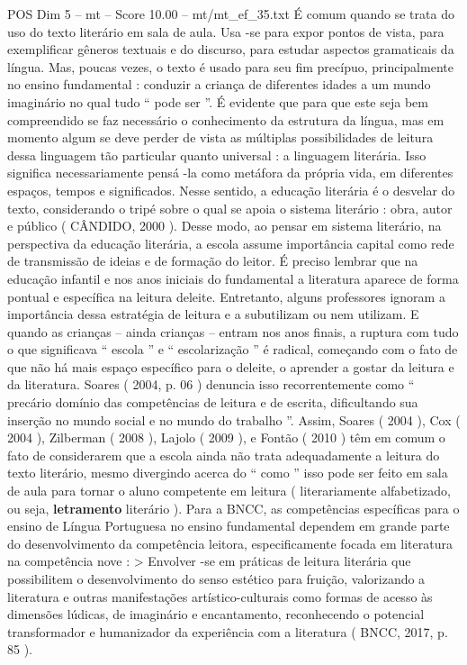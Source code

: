\begin{textsample}{POS Dim 5 – mt – Score 10.00 – mt/mt\_ef\_35.txt}
É comum quando se trata do uso do texto literário em sala de aula.
Usa -se para expor pontos de vista, para exemplificar gêneros textuais e do discurso, para estudar aspectos gramaticais da língua.
Mas, poucas vezes, o texto é usado para seu fim precípuo, principalmente no ensino fundamental : conduzir a criança de diferentes idades a um mundo imaginário no qual tudo “ pode ser ”.
É evidente que para que este seja bem compreendido se faz necessário o conhecimento da estrutura da língua, mas em momento algum se deve perder de vista as múltiplas possibilidades de leitura dessa linguagem tão particular quanto universal : a linguagem literária.
Isso significa necessariamente pensá -la como metáfora da própria vida, em diferentes espaços, tempos e significados.
Nesse sentido, a educação literária é o desvelar do texto, considerando o tripé sobre o qual se apoia o sistema literário : obra, autor e público ( CÂNDIDO, 2000 ).
Desse modo, ao pensar em sistema literário, na perspectiva da educação literária, a escola assume importância capital como rede de transmissão de ideias e de formação do leitor.
É preciso lembrar que na educação infantil e nos anos iniciais do fundamental a literatura aparece de forma pontual e específica na leitura deleite.
Entretanto, alguns professores ignoram a importância dessa estratégia de leitura e a subutilizam ou nem utilizam.
E quando as crianças – ainda crianças – entram nos anos finais, a ruptura com tudo o que significava “ escola ” e “ escolarização ” é radical, começando com o fato de que não há mais espaço específico para o deleite, o aprender a gostar da leitura e da literatura.
Soares ( 2004, p. 06 ) denuncia isso recorrentemente como “ precário domínio das competências de leitura e de escrita, dificultando sua inserção no mundo social e no mundo do trabalho ”.
Assim, Soares ( 2004 ), Cox ( 2004 ), Zilberman ( 2008 ), Lajolo ( 2009 ), e Fontão ( 2010 ) têm em comum o fato de considerarem que a escola ainda não trata adequadamente a leitura do texto literário, mesmo divergindo acerca do “ como ” isso pode ser feito em sala de aula para tornar o aluno competente em leitura ( literariamente alfabetizado, ou seja, \textbf{letramento} literário ).
Para a BNCC, as competências específicas para o ensino de Língua Portuguesa no ensino fundamental dependem em grande parte do desenvolvimento da competência leitora, especificamente focada em literatura na competência nove : > Envolver -se em práticas de leitura literária que possibilitem o desenvolvimento do senso estético para fruição, valorizando a literatura e outras manifestações artístico-culturais como formas de acesso às dimensões lúdicas, de imaginário e encantamento, reconhecendo o potencial transformador e humanizador da experiência com a literatura ( BNCC, 2017, p. 85 ).

\end{textsample}
